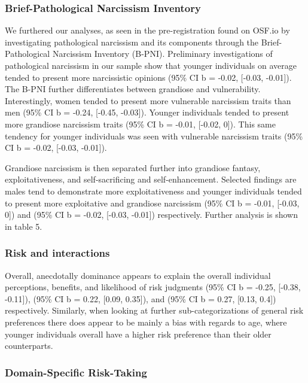 \documentclass[
  donotrepeattitle,doc, 12pt, a4paper,floatsintext]{apa7}
\begin{document}
\hypertarget{brief-pathological-narcissism-inventory-2}{%
\subsubsection{Brief-Pathological Narcissism Inventory}\label{brief-pathological-narcissism-inventory-2}}

We furthered our analyses, as seen in the pre-registration found on OSF.io by investigating pathological narcissism and its components through the Brief-Pathological Narcissism Inventory (B-PNI). Preliminary investigations of pathological narcissism in our sample show that younger individuals on average tended to present more narcissistic opinions (95\% CI b = -0.02, {[}-0.03, -0.01{]}). The B-PNI further differentiates between grandiose and vulnerability. Interestingly, women tended to present more vulnerable narcissism traits than men (95\% CI b = -0.24, {[}-0.45, -0.03{]}). Younger individuals tended to present more grandiose narcissism traits (95\% CI b = -0.01, {[}-0.02, 0{]}). This same tendency for younger individuals was seen with vulnerable narcissism traits (95\% CI b = -0.02, {[}-0.03, -0.01{]}).

Grandiose narcissism is then separated further into grandiose fantasy, exploitativeness, and self-sacrificing and self-enhancement. Selected findings are males tend to demonstrate more exploitativeness and younger individuals tended to present more exploitative and grandiose narcissism (95\% CI b = -0.01, {[}-0.03, 0{]}) and (95\% CI b = -0.02, {[}-0.03, -0.01{]}) respectively. Further analysis is shown in table 5.

\hypertarget{risk-and-interactions}{%
\subsubsection{Risk and interactions}\label{risk-and-interactions}}

Overall, anecdotally dominance appears to explain the overall individual perceptions, benefits, and likelihood of risk judgments (95\% CI b = -0.25, {[}-0.38, -0.11{]}), (95\% CI b = 0.22, {[}0.09, 0.35{]}), and (95\% CI b = 0.27, {[}0.13, 0.4{]}) respectively. Similarly, when looking at further sub-categorizations of general risk preferences there does appear to be mainly a bias with regards to age, where younger individuals overall have a higher risk preference than their older counterparts.

\hypertarget{domain-specific-risk-taking-2}{%
\subsubsection{Domain-Specific Risk-Taking}\label{domain-specific-risk-taking-2}}
\end{document}
